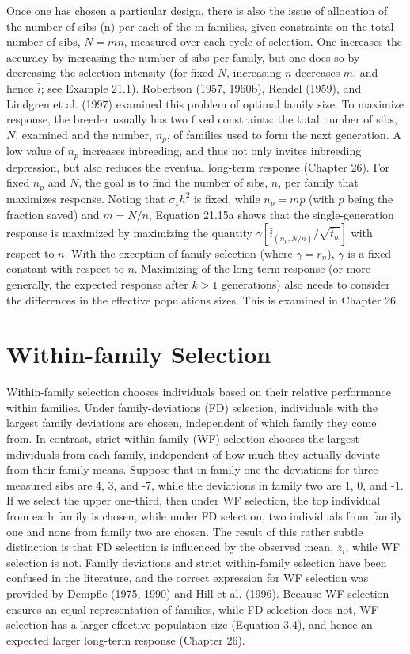 \documentclass{article}
\begin{document}
Once one has chosen a particular design, there is also the issue of allocation of the number of sibs (n) per each of the m families, given constraints on the total number of sibs, $N = mn$, measured over each cycle of selection. One increases the accuracy by increasing the number of sibs per family, but one does so by decreasing the selection intensity (for fixed $N$, increasing $n$ decreases $m$, and hence $\bar{i}$; see Example 21.1). Robertson (1957, 1960b), Rendel (1959), and Lindgren et al. (1997) examined this problem of optimal family size. To maximize response, the breeder usually has two fixed constraints: the total number of sibs, $N$, examined and the number, $n_{p}$, of families used to form the next generation. A low value of $n_{p}$ increases inbreeding, and thus not only invites inbreeding depression, but also reduces the eventual long-term response (Chapter 26). For fixed $n_{p}$ and $N$, the goal is to find the number of sibs, $n$, per family that maximizes response. Noting that $\sigma_{z} h^{2}$ is fixed, while $n_{p} = mp$ (with $p$ being the fraction saved) and $m = N/n$, Equation 21.15a shows that the single-generation response is maximized by maximizing the quantity $\gamma[\bar{i}_{(n_{p}, N/n)} / \sqrt{\bar{t}_{n}}]$ with respect to $n$. With the exception of family selection (where $\gamma = r_{n}$), $\gamma$ is a fixed constant with respect to $n$. Maximizing of the long-term response (or more generally, the expected response after $k > 1$ generations) also needs to consider the differences in the effective populations sizes. This is examined in Chapter 26.

\section{Within-family Selection}
Within-family selection chooses individuals based on their relative performance within families. Under family-deviations (FD) selection, individuals with the largest family deviations are chosen, independent of which family they come from. In contrast, strict within-family (WF) selection chooses the largest individuals from each family, independent of how much they actually deviate from their family means. Suppose that in family one the deviations for three measured sibs are 4, 3, and -7, while the deviations in family two are 1, 0, and -1. If we select the upper one-third, then under WF selection, the top individual from each family is chosen, while under FD selection, two individuals from family one and none from family two are chosen. The result of this rather subtle distinction is that FD selection is influenced by the observed mean,  $ \overline{z}_{i} $, while WF selection is not. Family deviations and strict within-family selection have been confused in the literature, and the correct expression for WF selection was provided by Dempfle (1975, 1990) and Hill et al. (1996). Because WF selection ensures an equal representation of families, while FD selection does not, WF selection has a larger effective population size (Equation 3.4), and hence an expected larger long-term response (Chapter 26).
\end{document}
